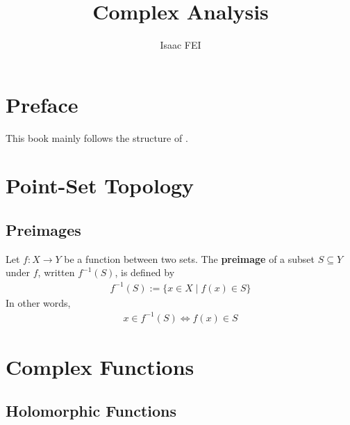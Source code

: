 \documentclass[thmcnt=section, color=cyan, 12pt]{my-elegantbook}
\title{Complex Analysis}
\author{Isaac FEI}
\begin{document}
\maketitle


\frontmatter
\chapter*{Preface}

This book mainly follows the structure of \cite{steinComplexAnalysis2003}.


\tableofcontents
\mainmatter



\chapter{Point-Set Topology}


\section{Preimages}

Let $f: X \to Y$ be a function between two sets. The \textbf{preimage} of a subset $S \subseteq Y$ under $f$,
written $f^{-1}(S)$, is defined by
\begin{align*}
	f^{-1}(S) := \{x \in X \mid f(x) \in S\}
\end{align*}
In other words,
\begin{align*}
	x \in f^{-1}(S) \iff f(x) \in S
\end{align*}


\chapter{Complex Functions}


\section{Holomorphic Functions}
\end{document}
